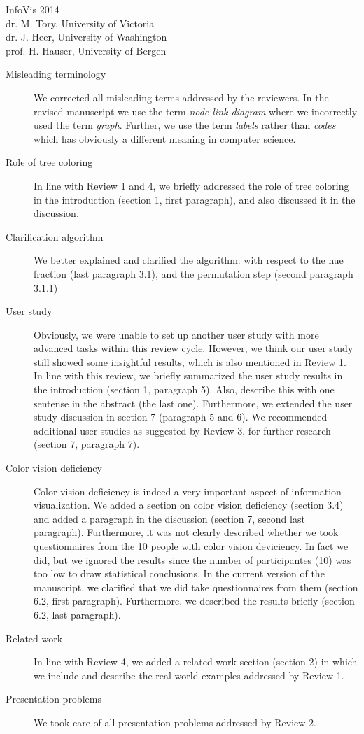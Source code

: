 \documentclass{letter}
\begin{document}
\begin{letter}{InfoVis 2014 \\ dr. M. Tory, University of Victoria \\ dr. J. Heer, University of Washington \\ prof. H. Hauser, University of Bergen}
\begin{description}
\item[Misleading terminology] We corrected all misleading terms addressed by the reviewers. In the revised manuscript we use the term \textit{node-link diagram} where we incorrectly used the term \textit{graph}. Further, we use the term \textit{labels} rather than \textit{codes} which has obviously a different meaning in computer science.
\item[Role of tree coloring] In line with Review 1 and 4, we briefly addressed the role of tree coloring in the introduction (section 1, first paragraph), and also discussed it in the discussion.
\item[Clarification algorithm] We better explained and clarified the algorithm: with respect to the hue fraction (last paragraph 3.1), and the permutation step (second paragraph 3.1.1)
\item[User study] Obviously, we were unable to set up another user study with more advanced tasks within this review cycle. However, we think our user study still showed some insightful results, which is also mentioned in Review 1.  In line with this review, we briefly summarized the user study results in the introduction (section 1, paragraph 5). Also, describe this with one sentense in the abstract (the last one). Furthermore, we extended the user study discussion in section 7 (paragraph 5 and 6). We recommended additional user studies as suggested by Review 3, for further research (section 7, paragraph 7).
\item[Color vision deficiency] Color vision deficiency is indeed a very important aspect of information visualization. We added a section on color vision deficiency (section 3.4) and added a paragraph in the discussion (section 7, second last paragraph). Furthermore, it was not clearly described whether we took questionnaires from the 10 people with color vision deviciency. In fact we did, but we ignored the results since the number of participantes (10) was too low to draw statistical conclusions. In the current version of the manuscript, we clarified that we did take questionnaires from them (section 6.2, first paragraph). Furthermore, we described the results briefly (section 6.2, last paragraph).
\item[Related work] In line with Review 4, we added a related work section (section 2) in which we include and describe the real-world examples addressed by Review 1.
\item[Presentation problems] We took care of all presentation problems addressed by Review 2.
\end{description}


\end{letter}
\end{document}
